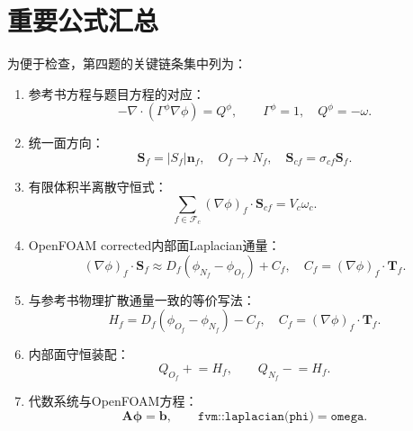 \documentclass[UTF8,12pt,a4paper]{ctexart}
\numberwithin{equation}{section}
\begin{document}
\newpage
\section{重要公式汇总}

为便于检查，第四题的关键链条集中列为：

\begin{enumerate}
  \item 参考书方程与题目方程的对应：
  \begin{equation*}
    \boxed{
    -\nabla\cdot(\Gamma^\phi\nabla\phi)=Q^\phi,
    \qquad
    \Gamma^\phi=1,
    \quad Q^\phi=-\omega.}
  \end{equation*}

  \item 统一面方向：
  \begin{equation*}
    \boxed{
    \bm S_f=|S_f|\bm n_f,
    \quad O_f\to N_f,
    \quad \bm S_{cf}=\sigma_{cf}\bm S_f.}
  \end{equation*}

  \item 有限体积半离散守恒式：
  \begin{equation*}
    \boxed{
    \sum_{f\in\mathcal F_c}
    (\nabla\phi)_f\cdot\bm S_{cf}
    =V_c\omega_c.}
  \end{equation*}

  \item OpenFOAM corrected内部面Laplacian通量：
  \begin{equation*}
    \boxed{
    (\nabla\phi)_f\cdot\bm S_f
    \approx
    D_f(\phi_{N_f}-\phi_{O_f})+C_f,
    \quad C_f=(\nabla\phi)_f\cdot\bm T_f.}
  \end{equation*}

  \item 与参考书物理扩散通量一致的等价写法：
  \begin{equation*}
    \boxed{
    H_f=D_f(\phi_{O_f}-\phi_{N_f})-C_f,
    \quad C_f=(\nabla\phi)_f\cdot\bm T_f.}
  \end{equation*}

  \item 内部面守恒装配：
  \begin{equation*}
    \boxed{
    Q_{O_f}\mathrel{+}=H_f,
    \qquad Q_{N_f}\mathrel{-}=H_f.}
  \end{equation*}

  \item 代数系统与OpenFOAM方程：
  \begin{equation*}
    \boxed{
    \bm A\bm\phi=\bm b,
    \qquad
    \texttt{fvm::laplacian(phi)}=\texttt{omega}.}
  \end{equation*}


\end{enumerate}
\end{document}
